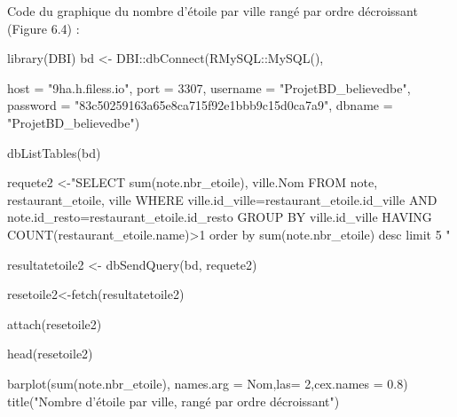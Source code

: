 \documentclass[mstat,12pt]{unswthesis}
\newenvironment{Shaded}{\begin{snugshade}}{\end{snugshade}}
\newcommand{\AttributeTok}[1]{\textcolor[rgb]{0.77,0.63,0.00}{#1}}
\newcommand{\DecValTok}[1]{\textcolor[rgb]{0.00,0.00,0.81}{#1}}
\newcommand{\FloatTok}[1]{\textcolor[rgb]{0.00,0.00,0.81}{#1}}
\newcommand{\FunctionTok}[1]{\textcolor[rgb]{0.00,0.00,0.00}{#1}}
\newcommand{\NormalTok}[1]{#1}
\newcommand{\OtherTok}[1]{\textcolor[rgb]{0.56,0.35,0.01}{#1}}
\newcommand{\SpecialCharTok}[1]{\textcolor[rgb]{0.00,0.00,0.00}{#1}}
\newcommand{\StringTok}[1]{\textcolor[rgb]{0.31,0.60,0.02}{#1}}
\begin{document}
\normalsize
\bigskip

Code du graphique du nombre d'étoile par ville rangé par ordre
décroissant (Figure 6.4) : \tiny

\begin{Shaded}
\begin{Highlighting}[]
\FunctionTok{library}\NormalTok{(DBI)}
\NormalTok{bd }\OtherTok{\textless{}{-}}\NormalTok{ DBI}\SpecialCharTok{::}\FunctionTok{dbConnect}\NormalTok{(RMySQL}\SpecialCharTok{::}\FunctionTok{MySQL}\NormalTok{(),}
                     
                     \AttributeTok{host =} \StringTok{"9ha.h.filess.io"}\NormalTok{, }\AttributeTok{port =} \DecValTok{3307}\NormalTok{,}
                     \AttributeTok{username =} \StringTok{"ProjetBD\_believedbe"}\NormalTok{,}
                     \AttributeTok{password =} \StringTok{"83c50259163a65e8ca715f92e1bbb9c15d0ca7a9"}\NormalTok{,}
                     \AttributeTok{dbname =} \StringTok{"ProjetBD\_believedbe"}\NormalTok{)}

\FunctionTok{dbListTables}\NormalTok{(bd)}

\NormalTok{requete2 }\OtherTok{\textless{}{-}}\StringTok{"SELECT sum(note.nbr\_etoile), ville.Nom}
\StringTok{ FROM note, restaurant\_etoile, ville}
\StringTok{ WHERE ville.id\_ville=restaurant\_etoile.id\_ville}
\StringTok{ AND note.id\_resto=restaurant\_etoile.id\_resto}
\StringTok{ GROUP BY ville.id\_ville}
\StringTok{ HAVING COUNT(restaurant\_etoile.name)\textgreater{}1}
\StringTok{ order by sum(note.nbr\_etoile) desc}
\StringTok{ limit 5}
\StringTok{"}

\NormalTok{resultatetoile2 }\OtherTok{\textless{}{-}} \FunctionTok{dbSendQuery}\NormalTok{(bd, requete2)}

\NormalTok{resetoile2}\OtherTok{\textless{}{-}}\FunctionTok{fetch}\NormalTok{(resultatetoile2)}

\FunctionTok{attach}\NormalTok{(resetoile2)}

\FunctionTok{head}\NormalTok{(resetoile2)}

\FunctionTok{barplot}\NormalTok{(}\StringTok{\textasciigrave{}}\AttributeTok{sum(note.nbr\_etoile)}\StringTok{\textasciigrave{}}\NormalTok{, }\AttributeTok{names.arg =}\NormalTok{ Nom,}\AttributeTok{las=} \DecValTok{2}\NormalTok{,}\AttributeTok{cex.names =} \FloatTok{0.8}\NormalTok{)}
\FunctionTok{title}\NormalTok{(}\StringTok{"Nombre d’étoile par ville, rangé par ordre décroissant"}\NormalTok{)}
\end{Highlighting}
\end{Shaded}

\normalsize
\end{document}
